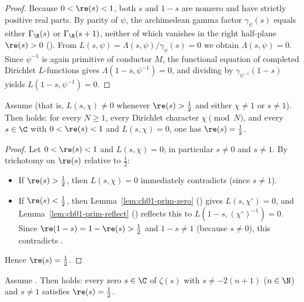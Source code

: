 \begin{proof}
Because $0 < \re(s) < 1$, both $s$ and $1 - s$ are nonzero and have strictly
positive real parts.
By parity of $\psi$, the archimedean gamma factor $\gamma_{\psi}(s)$ equals
either $\Gamma_{\R}(s)$ or $\Gamma_{\R}(s + 1)$, neither of which vanishes in
the right half-plane $\re(s) > 0$ ().
From $L(s, \psi) = \Lambda(s, \psi)/\gamma_{\psi}(s) = 0$ we obtain
$\Lambda(s, \psi) = 0$.
Since $\psi^{-1}$ is again primitive of conductor $M$, the functional equation
of completed Dirichlet $L$-functions gives $\Lambda(1 - s, \psi^{-1}) = 0$, and
dividing by $\gamma_{\psi^{-1}}(1 - s)$ yields $L(1 - s, \psi^{-1}) = 0$.
\end{proof}

\begin{proposition}
\label{prop:ch01-claim-strip}
Assume  (that is, $L(s, \chi) \neq 0$ whenever
$\re(s) > \tfrac{1}{2}$ and either $\chi \neq 1$ or $s \neq 1$).
Then  holds: for every $N \ge 1$, every Dirichlet
character $\chi \pmod{N}$, and every $s \in \C$ with $0 < \re(s) < 1$ and
$L(s, \chi) = 0$, one has $\re(s) = \tfrac{1}{2}$.
\end{proposition}

\begin{proof}
Let $0 < \re(s) < 1$ and $L(s, \chi) = 0$; in particular $s \neq 0$ and
$s \neq 1$.
By trichotomy on $\re(s)$ relative to $\tfrac{1}{2}$:
\begin{itemize}
  \item If $\re(s) > \tfrac{1}{2}$, then $L(s, \chi) = 0$ immediately
  contradicts  (since $s \neq 1$).
  \item If $\re(s) < \tfrac{1}{2}$, then Lemma~\ref{lem:ch01-prim-zero}
  () gives $L(s, \chi^{\circ}) = 0$, and
  Lemma~\ref{lem:ch01-prim-reflect} () reflects
  this to $L(1 - s, (\chi^{\circ})^{-1}) = 0$.
  Since $\re(1 - s) = 1 - \re(s) > \tfrac{1}{2}$ and $1 - s \neq 1$ (because
  $s \neq 0$), this contradicts .
\end{itemize}
Hence $\re(s) = \tfrac{1}{2}$.
\end{proof}

\begin{proposition}
\label{prop:ch01-claim-zeta}
Assume .
Then  holds: every zero $s \in \C$ of $\zeta(s)$ with
$s \neq -2(n+1)$ ($n \in \N$) and $s \neq 1$ satisfies $\re(s) = \tfrac{1}{2}$.
\end{proposition}

